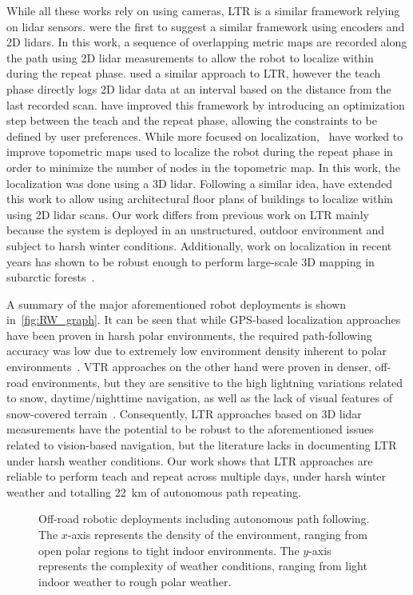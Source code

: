 While all these works rely on using cameras, \ac{LTR} is a similar framework relying on lidar sensors.
\citet{Marshall2008} were the first to suggest a similar framework using encoders and 2D lidars.
In this work, a sequence of overlapping metric maps are recorded along the path using 2D lidar measurements to allow the robot to localize within during the repeat phase.
\citet{Sprunk2013} used a similar approach to \ac{LTR}, however the teach phase directly logs 2D lidar data at an interval based on the distance from the last recorded scan.
\citet{Mazuran2015} have improved this framework by introducing an optimization step between the teach and the repeat phase, allowing the constraints to be defined by user preferences.
While more focused on localization,~\citet{Landry2016} have worked to improve topometric maps used to localize the robot during the repeat phase in order to minimize the number of nodes in the topometric map.
In this work, the localization was done using a 3D lidar. 
Following a similar idea, \citet{Boniardi2017} have extended this work to allow using architectural floor plans of buildings to localize within using 2D lidar scans.
Our work differs from previous work on \ac{LTR} mainly because the system is deployed in an unstructured, outdoor environment and subject to harsh winter conditions. 
Additionally, work on localization in recent years has shown to be robust enough to perform large-scale 3D mapping in subarctic forests~\citep{Babin2019}.


A summary of the major aforementioned robot deployments is shown in~\autoref{fig:RW_graph}.
It can be seen that while \ac{GPS}-based localization approaches have been proven in harsh polar environments, the required path-following accuracy was low due to extremely low environment density inherent to polar environments~\citep{Lever2013}.
\ac{VTR} approaches on the other hand were proven in denser, off-road environments, but they are sensitive to the high lightning variations related to snow, daytime/nighttime navigation, as well as the lack of visual features of snow-covered terrain~\citep{Paton2017}.
Consequently, \ac{LTR} approaches based on 3D lidar measurements have the potential to be robust to the aforementioned issues related to vision-based navigation, but the literature lacks in documenting \ac{LTR} under harsh weather conditions.
Our work shows that \ac{LTR} approaches are reliable to perform teach and repeat across multiple days, under harsh winter weather and totalling \SI{22}{km} of autonomous path repeating.

\begin{figure}[thbp]
	\centering
	
	\caption{Off-road robotic deployments including autonomous path following.
	The $x$-axis represents the density of the environment, ranging from open polar regions to tight indoor environments.
	The $y$-axis represents the complexity of weather conditions, ranging from light indoor weather to rough polar weather.}
	\label{fig:RW_graph}
\end{figure}




